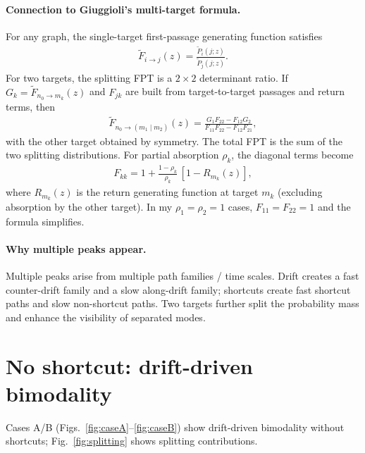 \documentclass[11pt]{article}
\begin{document}
\paragraph{Connection to Giuggioli's multi-target formula.}
For any graph, the single-target first-passage generating function satisfies
\begin{align}
  \widetilde F_{i\to j}(z)=\frac{\widetilde P_i(j;z)}{\widetilde P_j(j;z)}.
\end{align}
For two targets, the splitting FPT is a $2\times2$ determinant ratio\cite{giuggioli2023}. If
$G_k=\widetilde F_{n_0\to m_k}(z)$ and $F_{jk}$ are built from target-to-target passages and return terms, then
\begin{align}
\widetilde F_{n_0\to (m_1\mid m_2)}(z)=\frac{G_1F_{22}-F_{12}G_2}{F_{11}F_{22}-F_{12}F_{21}},
\end{align}
with the other target obtained by symmetry. The total FPT is the sum of the two splitting distributions.
For partial absorption $\rho_k$, the diagonal terms become
\begin{align}
  F_{kk}=1+\frac{1-\rho_k}{\rho_k}\,[1-R_{m_k}(z)],
\end{align}
where $R_{m_k}(z)$ is the return generating function at target $m_k$ (excluding absorption by the other target).
In my $\rho_1=\rho_2=1$ cases, $F_{11}=F_{22}=1$ and the formula simplifies.

\paragraph{Why multiple peaks appear.}
Multiple peaks arise from multiple path families / time scales.
Drift creates a fast counter-drift family and a slow along-drift family; shortcuts create fast shortcut paths and slow non-shortcut paths.
Two targets further split the probability mass and enhance the visibility of separated modes.

\section*{No shortcut: drift-driven bimodality}
Cases A/B (Figs.~\ref{fig:caseA}--\ref{fig:caseB}) show drift-driven bimodality without shortcuts; Fig.~\ref{fig:splitting} shows splitting contributions.
\end{document}
